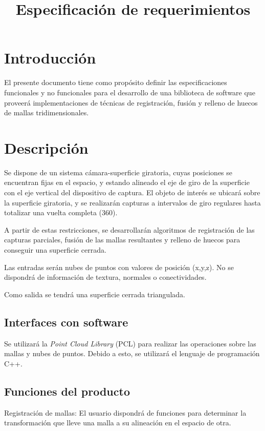 \documentclass{pfc}
\title{Especificación de requerimientos}
\begin{document}
	\maketitle
	\tableofcontents
	\section{Introducción}
	El presente documento tiene como propósito definir las especificaciones
	funcionales y no funcionales para el desarrollo de una biblioteca de
	software que proveerá implementaciones de técnicas de registración, fusión
	y relleno de huecos de mallas tridimensionales.

	\section{Descripción}
		Se dispone de un sistema cámara-superficie giratoria, cuyas posiciones
		se encuentran fijas en el espacio, y estando alineado el eje de giro de
		la superficie con el eje vertical del dispositivo de captura.
		El objeto de interés se ubicará sobre la superficie giratoria, y se
		realizarán capturas a intervalos de giro regulares
		hasta totalizar una vuelta completa (360\textdegree).

		A partir de estas restricciones, se desarrollarán algoritmos de
		registración de las capturas parciales,
		fusión de las mallas resultantes
		y relleno de huecos para conseguir una superficie cerrada.

		Las entradas serán nubes de puntos con valores de posición (x,y,z).
		No se dispondrá de información de textura, normales o conectividades.

		Como salida se tendrá una superficie cerrada triangulada.

		\subsection{Interfaces con software}
			Se utilizará la \emph{Point Cloud Library} (PCL)
			para realizar las operaciones sobre las mallas y nubes de puntos.
			Debido a esto, se utilizará el lenguaje de programación C++.

		\subsection{Funciones del producto}
			Registración de mallas:
				El usuario dispondrá de funciones para
				determinar la transformación que lleve una malla
				a su alineación en el espacio de otra.
\end{document}
